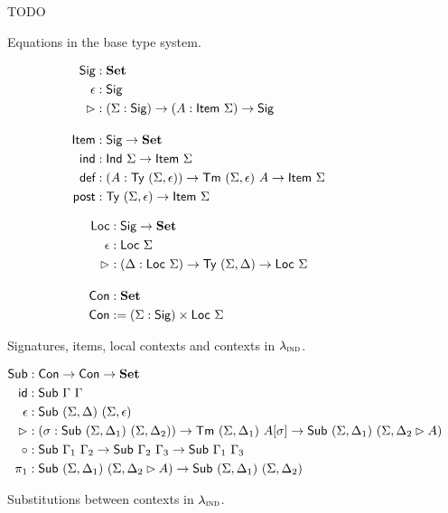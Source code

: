 \begin{figure}[H]
  TODO
  \caption{Equations in the base type system.}
\end{figure}

\begin{figure}[H]
  \begin{minipage}[t]{0.5\textwidth}
  \begin{align*}
  \textsf{Sig} &: \mathbf{Set} \\
  \epsilon &: \textsf{Sig} \\
  \rhd &: (\Sigma : \textsf{Sig}) \to (A : \textsf{Item}\ \Sigma) \to \textsf{Sig} \\[1em]
  \textsf{Item} &: \textsf{Sig} \to \mathbf{Set} \\
  \textsf{ind} &: \textsf{Ind}\ \Sigma \to \textsf{Item}\ \Sigma \\
  \textsf{def} &: (A : \textsf{Ty}\ (\Sigma, \epsilon)) \to \textsf{Tm}\ (\Sigma, \epsilon)\ A \to \textsf{Item}\ \Sigma \\
  \textsf{post} &: \textsf{Ty}\ (\Sigma, \epsilon) \to \textsf{Item}\ \Sigma \\
  \end{align*}
  \end{minipage}
  \begin{minipage}[t]{0.5\textwidth}
  \begin{align*}
  \Loc &: \Sig \to \Set \\
  \epsilon &: \Loc\ \Sigma \\
  \rhd &: (\Delta : \Loc\ \Sigma) \to \Ty\ (\Sigma,\Delta) \to \Loc\ \Sigma \\[1em]
  \Con &: \Set \\
  \Con &:= (\Sigma : \Sig) \times \Loc\ \Sigma
  \end{align*}
  \end{minipage}
  \caption{Signatures, items, local contexts and contexts in $\lambda_{\textsc{ind}}$.}
  \label{fig:lambdaind-signatures-contexts}
\end{figure}

\begin{figure}[H]
  \begin{minipage}[t]{\textwidth}
  \begin{align*}
  \Sub &: \Con \to \Con \to \Set \\
  \mta{id} &: \Sub\ \Gamma\ \Gamma \\
  \epsilon &: \Sub\ (\Sigma, \Delta)\ (\Sigma, \epsilon) \\
  \rhd &: (\sigma : \Sub\ (\Sigma,\Delta_1)\ (\Sigma,\Delta_2)) \to \Tm\ (\Sigma, \Delta_1)\ A[\sigma] \to \Sub\ (\Sigma,\Delta_1)\ (\Sigma,\Delta_2 \rhd A) \\
  \circ &: \Sub\ \Gamma_1\ \Gamma_2 \to \Sub\ \Gamma_2\ \Gamma_3 \to \Sub\ \Gamma_1\ \Gamma_3 \\
  \pi_1 &: \Sub\ (\Sigma,\Delta_1)\ (\Sigma, \Delta_2 \rhd A) \to \Sub\ (\Sigma,\Delta_1)\ (\Sigma,\Delta_2) 
  \end{align*}
  \end{minipage}
  \caption{Substitutions between contexts in $\lambda_{\textsc{ind}}$.}
  \label{fig:lambdaind-substitutions}
\end{figure}

